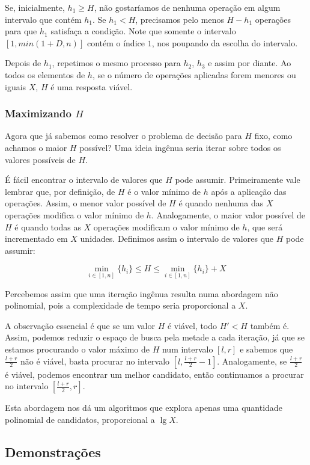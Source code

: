 Se, inicialmente, $h_1 \geq H$, não gostaríamos de  nenhuma operação em algum intervalo que contém $h_1$. Se $h_1 < H$, precisamos pelo menos $H - h_1$ operações para que $h_1$ satisfaça a condição. Note que somente o intervalo $[1, min(1 + D, n)]$ contém o índice $1$, nos poupando da escolha do intervalo.

Depois de  $h_1$, repetimos o mesmo processo para $h_2$, $h_3$ e assim por diante. Ao  todos os elementos de $h$, se o número de operações aplicadas forem menores ou iguais $X$, $H$ é uma resposta viável.

\subsubsection*{Maximizando $H$}

Agora que já sabemos como resolver o problema de decisão para $H$ fixo, como achamos o maior $H$ possível? Uma ideia ingênua seria iterar sobre todos os valores possíveis de $H$.

É fácil encontrar o intervalo de valores que $H$ pode assumir. Primeiramente vale lembrar que, por definição, de $H$ é o valor mínimo de $h$ após a aplicação das operações. Assim, o menor valor possível de $H$ é quando nenhuma das $X$ operações modifica o valor mínimo de $h$. Analogamente, o maior valor possível de $H$ é quando todas as $X$ operações modificam o valor mínimo de $h$, que será incrementado em $X$ unidades. Definimos assim o intervalo de valores que $H$ pode assumir:


$$\min_{i \in [1, n]}\{h_i\} \leq H \leq \min_{i \in [1, n]}\{h_i\} + X$$

Percebemos assim que uma iteração ingênua resulta numa abordagem não polinomial, pois a complexidade de tempo seria proporcional a $X$.

A observação essencial é que se um valor $H$ é viável, todo $H' < H$ também é. Assim, podemos reduzir o espaço de busca pela metade a cada iteração, já que se estamos procurando o valor máximo de $H$ num intervalo $[l, r]$ e sabemos que $\frac{l + r}{2}$ não é viável, basta procurar no intervalo ${[l, \frac{l + r}{2} - 1]}$. Analogamente, se $\frac{l + r}{2}$ é viável, podemos encontrar um melhor candidato, então continuamos a procurar no intervalo $[\frac{l + r}{2}, r]$.

Esta abordagem nos dá um algoritmos que explora apenas uma quantidade polinomial de candidatos, proporcional a $\lg X$.

\subsection*{Demonstrações}

